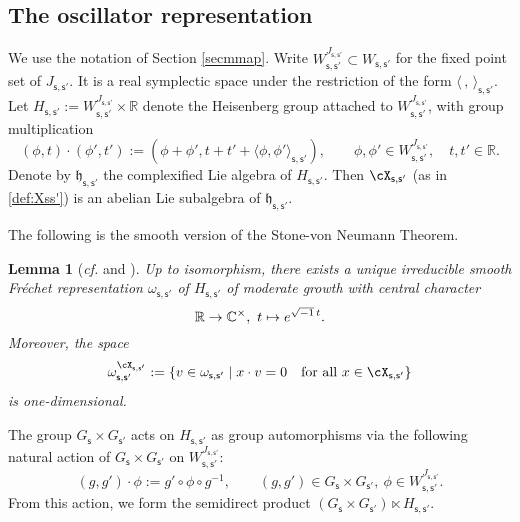 \documentclass[12pt,a4paper]{amsart}
\newcommand{\h}{\mathfrak h}
\newcommand{\R}{\mathbb R}
\newcommand{\la}{\langle}
\newcommand{\ra}{\rangle}
\numberwithin{equation}{section}
\newtheorem{lem}[thm]{Lemma}
\theoremstyle{remark}
\def\cf{\emph{cf.} }
\begin{document}
\subsection{The oscillator representation}\label{secoscil}
We use the notation of Section \ref{secmmap}. Write
$
  W_{\mathsf s, \mathsf s'}^{J_{\mathsf s, \mathsf s'}}\subset W_{\mathsf s, \mathsf s'}
$
for the fixed point set of $J_{\mathsf s, \mathsf s'}$. It is a real symplectic space under the restriction of the form $\la\,,\,\ra_{\mathsf s, \mathsf s'}$. Let $H_{\mathsf s, \mathsf s'}:= W_{\mathsf s, \mathsf s'}^{J_{\mathsf s, \mathsf s'}}\times \R$
denote the Heisenberg group attached to $W_{\mathsf s, \mathsf s'}^{J_{\mathsf s, \mathsf s'}}$, with group multiplication
\[
  (\phi ,t)\cdot (\phi ', t'):=(\phi +\phi ', t+t'+\la \phi , \phi '\ra_{\mathsf s, \mathsf s'}), \qquad \phi ,\phi '\in  W_{\mathsf s, \mathsf s'}^{J_{\mathsf s, \mathsf s'}}, \quad t, t'\in \R.
\]
Denote by $\h_{\mathsf s, \mathsf s'}$ the complexified Lie algebra of $H_{\mathsf s, \mathsf s'}$. Then  $\cX_{\mathsf s, \mathsf s'}$ (as in \eqref{def:Xss'}) is  an abelian Lie subalgebra of $\h_{\mathsf s, \mathsf s'}$.

The following is the smooth version of the Stone-von Neumann Theorem.

\begin{lem}[{\cf \cite[Theorem 5.1]{Cl89} and \cite[Section 4]{Ad07}}]\label{vn} 
Up to isomorphism, there exists a unique irreducible smooth Fr\'echet representation $\omega_{\mathsf s, \mathsf s'}$ of $H_{\mathsf s, \mathsf s'}$ of moderate growth with central character
\[
\R\rightarrow \C^\times, \ t\mapsto e^{\sqrt{-1}\, t}.
\]
Moreover, the space
\[
  \omega_{\mathsf s, \mathsf s'}^{\cX_{\mathsf s, \mathsf s'}}:=\{v\in \omega_{\mathsf s, \mathsf s'}\mid x \cdot v=0\quad \textrm{for all $x\in \cX_{\mathsf s, \mathsf s'}$}\}
\]
is one-dimensional.
\end{lem}



The group $G_{\mathsf s}\times G_{\mathsf s'}$ acts on $H_{\mathsf s, \mathsf s'}$ as group automorphisms via the following natural action of $G_{\mathsf s}\times G_{\mathsf s'}$ on  $W_{\mathsf s, \mathsf s'}^{J_{\mathsf s, \mathsf s'}}$:
\[
  (g, g')\cdot \phi:=g'\circ \phi\circ g^{-1}, \qquad (g,g')\in G_{\mathsf s}\times G_{\mathsf s'},\ \phi\in W_{\mathsf s, \mathsf s'}^{J_{\mathsf s, \mathsf s'}}.
\]
From this action, we form the semidirect product $(G_{\mathsf s}\times G_{\mathsf s'})\ltimes H_{\mathsf s, \mathsf s'}$.
\end{document}
